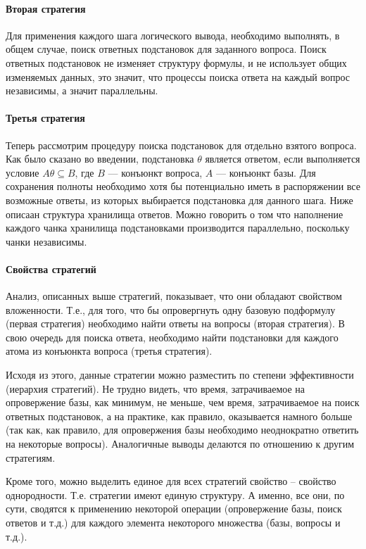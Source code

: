 \paragraph{Вторая стратегия}
Для применения каждого шага логического вывода, необходимо выполнять, в общем случае, поиск ответных подстановок для заданного вопроса. Поиск ответных подстановок не изменяет структуру формулы, и не использует общих изменяемых данных, это значит, что процессы поиска ответа на каждый вопрос независимы, а значит параллельны. 


\paragraph{Третья стратегия}
Теперь рассмотрим процедуру поиска подстановок для отдельно взятого вопроса. 
Как было сказано во введении, подстановка $\theta$ является ответом, если выполняется 
условие $A\theta \subseteq B$, где $B$ --- конъюнкт вопроса, $A$ --- конъюнкт базы. 
Для сохранения полноты необходимо хотя бы потенциально иметь в распоряжении все возможные ответы, 
из которых выбирается подстановка для данного шага. Ниже описаан структура хранилища ответов. Можно говорить о том что наполнение каждого чанка хранилища подстановками производится параллельно, поскольку чанки независимы.

\paragraph{Свойства стратегий}

Анализ, описанных выше стратегий, показывает, что они обладают свойством вложенности. Т.е., для того, что бы опровергнуть одну базовую подформулу (первая стратегия) необходимо найти ответы на вопросы (вторая стратегия). В свою очередь для поиска ответа, необходимо найти подстановки для каждого атома из конъюнкта вопроса (третья стратегия).

Исходя из этого, данные стратегии можно разместить по степени эффективности (иерархия стратегий). Не трудно видеть, что время, затрачиваемое на опровержение базы, как минимум, не меньше, чем время, затрачиваемое на поиск ответных подстановок, а на практике, как правило, оказывается намного больше (так как, как правило, для опровержения базы необходимо неоднократно ответить на некоторые вопросы). Аналогичные выводы делаются по отношению к другим стратегиям. 

Кроме того, можно выделить единое для всех стратегий свойство – свойство однородности. Т.е. стратегии имеют единую структуру. А именно, все они, по сути, сводятся к применению некоторой операции (опровержение базы, поиск ответов и т.д.) для каждого элемента некоторого множества (базы, вопросы и т.д.). 

